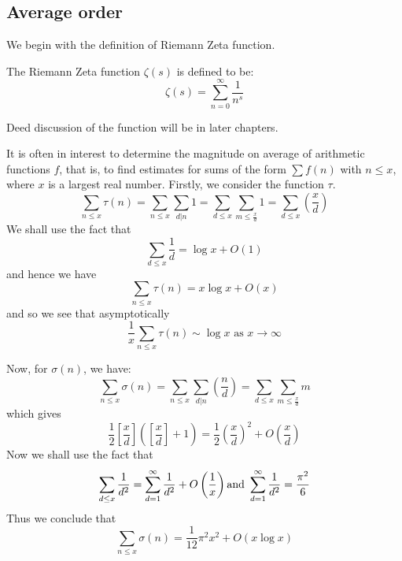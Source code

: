 \subsection{Average order}
We begin with the definition of Riemann Zeta function.
\begin{definition} The Riemann Zeta function $\zeta(s)$ is defined to be:
\begin{equation*} \zeta(s)=\sum_{n=0}^{\infty}\frac{1}{n^s} \end{equation*}
\end{definition}
\begin{flushleft} Deed discussion of the function will be in later chapters. \end{flushleft}
It is often in interest to determine the magnitude on average of arithmetic functions $f$, that is, to find estimates for sums of the form $\sum f(n)$ with $n \le x$, where $x$ is a largest real number.
Firstly, we consider the function $\tau$.
\begin{equation*}
\sum_{n \le x}\tau(n)=\sum_{n \le x} \sum_{d|n}1=\sum_{d \le x} \sum_{m \le \frac{x}{d}}1=\sum_{d \le x}\left(\frac{x}{d}\right)
\end{equation*}
We shall use the fact that
\begin{equation*} \sum_{d \le x}\frac{1}{d}=\log{x}+O(1) \end{equation*}
and hence we have
\begin{equation*} \sum_{n \le x}\tau(n)=x \log{x} + O(x) \end{equation*}
and so we see that asymptotically
\begin{equation*} \frac{1}{x} \sum_{n \le x}\tau(n) \sim \log{x} \text{ as } x \to \infty \end{equation*}

Now, for $\sigma(n)$, we have:
\begin{equation*} \sum_{n \le x}\sigma(n) = \sum_{n \le x}\sum_{d|n}\left(\frac{n}{d}\right)=\sum_{d \le x} \sum_{m \le \frac{x}{d}}m \end{equation*}
which gives
\begin{equation*} \frac{1}{2}\left[\frac{x}{d}\right]\left(\left[\frac{x}{d}\right]+1 \right) =\frac{1}{2}\left(\frac{x}{d}\right)^2 + O\left(\frac{x}{d}\right)
\end{equation*}
Now we shall use the fact that
\begin{equation*}
\sum_{d \le x}\frac{1}{d^2}=\sum_{d=1}^{\infty}\frac{1}{d^2} + O \left(\frac{1}{x}\right) \\
\text{and } \sum_{d=1}^{\infty}\frac{1}{d^2}=\frac{\pi^2}{6}
\end{equation*}
Thus we conclude that
\begin{equation*}
\sum_{n \le x}\sigma(n)=\frac{1}{12} \pi^2 x^2 + O\left(x \log{x} \right)
\end{equation*}

